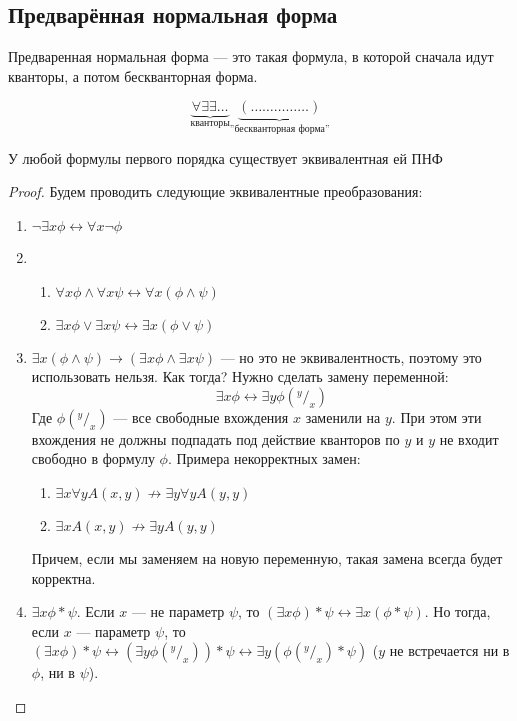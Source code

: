
\subsection{Предварённая нормальная форма}
\begin{definition}
    Предваренная нормальная форма --- это такая формула, в которой сначала идут кванторы, а потом бескванторная форма.
\end{definition}

$$\underbrace{\forall\exists\exists\dots}_{\text{кванторы}}\underbrace{(\dots\dots\dots\dots\dots)}_{\text{''бескванторная форма''}}$$

\begin{theorem}
    У любой формулы первого порядка существует эквивалентная ей ПНФ
\end{theorem}
\begin{proof}
    Будем проводить следующие эквивалентные преобразования:
    \begin{enumerate}
        \item $\neg \exists x \phi \longleftrightarrow \forall x \neg \phi$
        \item \begin{enumerate}
            \item $\forall x \phi \wedge \forall x \psi \longleftrightarrow \forall x (\phi \wedge \psi)$
            \item $\exists x \phi \vee \exists x \psi \longleftrightarrow \exists x (\phi \vee \psi)$
        \end{enumerate} 
        \item $\exists x (\phi \wedge \psi) \rightarrow (\exists x\phi \wedge \exists x\psi)$ --- но это не эквивалентность, поэтому это использовать нельзя. Как тогда? Нужно сделать замену переменной:
        $$\exists x \phi \longleftrightarrow \exists y \phi(^y/_x)$$
        Где $\phi(^y/_x)$ --- все свободные вхождения $x$ заменили на $y$. При этом эти вхождения не должны подпадать под действие кванторов по $y$ и $y$ не входит свободно в формулу $\phi$. Примера некорректных замен:
        \begin{enumerate}
            \item $\exists x \forall y A(x, y) \not\rightarrow \exists y \forall y A(y, y)$
            \item $\exists x A(x, y) \not\rightarrow \exists y A(y, y)$
        \end{enumerate}
        Причем, если мы заменяем на новую переменную, такая замена всегда будет корректна.

        \item \(\exists x \phi * \psi\). Если $x$ --- не параметр $\psi$, то $(\exists x \phi) * \psi \longleftrightarrow \exists x (\phi * \psi)$. Но тогда, если $x$ --- параметр $\psi$, то $(\exists x \phi) * \psi \longleftrightarrow (\exists y \phi(^y/_x)) * \psi \longleftrightarrow \exists y (\phi(^y/_x) * \psi)$ ($y$ не встречается ни в $\phi$, ни в $\psi$).
    \end{enumerate}
\end{proof}

